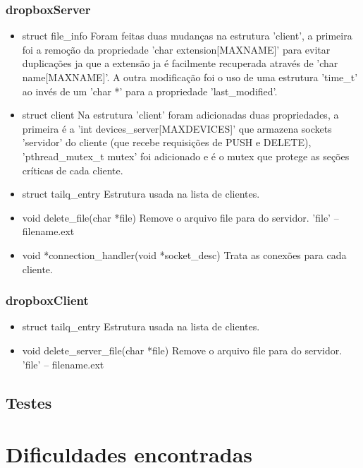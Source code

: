 \documentclass[a4paper]{article}
\begin{document}
\subsubsection{dropboxServer}
\begin{itemize}
	\item struct file\_info
	\newline Foram feitas duas mudanças na estrutura 'client', a primeira foi a remoção da propriedade 'char extension[MAXNAME]' para evitar duplicações ja que a extensão ja é facilmente recuperada através de 'char name[MAXNAME]'. A outra modificação foi o uso de uma estrutura 'time\_t' ao invés de um 'char *' para a propriedade 'last\_modified'.
	
	\item struct client
	\newline Na estrutura 'client' foram adicionadas duas propriedades, a primeira é a 'int devices\_server[MAXDEVICES]' que armazena sockets 'servidor' do cliente (que recebe requisições de PUSH e DELETE), 'pthread\_mutex\_t mutex' foi adicionado e é o mutex que protege as seções críticas de cada cliente.
	
	\item struct tailq\_entry
	\newline Estrutura usada na lista de clientes.
	
	\item void delete\_file(char *file)
	\newline Remove o arquivo file para do servidor. 'file' – filename.ext
	
	\item void *connection\_handler(void *socket\_desc)
	\newline Trata as conexões para cada cliente.

\end{itemize}


\subsubsection{dropboxClient}
\begin{itemize}
	\item struct tailq\_entry
	\newline Estrutura usada na lista de clientes.
	
	\item void delete\_server\_file(char *file)
	\newline Remove o arquivo file para do servidor. 'file' – filename.ext
\end{itemize}
\subsection{Testes}

\section{Dificuldades encontradas}
 


\end{document}
